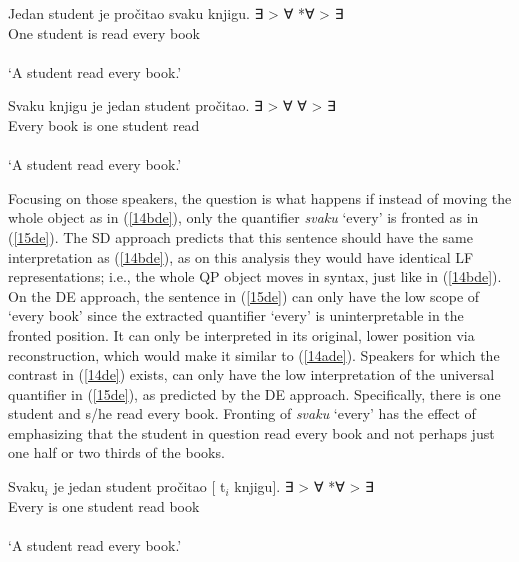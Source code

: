 \documentclass[
    output=paper,
    colorlinks,
    citecolor=brown,
]{langscibook}
\begin{document}
\begin{exe}
\ex \label{14de}
\begin{xlist}
\ex \label{14ade}
\gll Jedan student je pročitao svaku knjigu. \hspace{18mm} \cmark ∃ > ∀ *∀ > ∃\\
One student is read every book\\\\
‘A student read every book.’ 


\ex \label{14bde}
\gll Svaku knjigu je jedan student pročitao. \hspace{18mm} \cmark ∃ > ∀ \cmark ∀ > ∃ \\
Every book is one student read\\\\
‘A student read every book.’ 

\end{xlist}
\end{exe}

Focusing on those speakers, the question is what happens if instead of moving the whole object as in (\ref{14bde}), only the quantifier \textit{svaku} ‘every’ is fronted as in (\ref{15de}). The SD approach predicts that this sentence should have the same interpretation as (\ref{14bde}), as on this analysis they would have identical LF representations; i.e., the whole QP object moves in syntax, just like in (\ref{14bde}). On the DE approach, the sentence in (\ref{15de}) can only have the low scope of ‘every book’ since the extracted quantifier ‘every’ is uninterpretable in the fronted position. It can only be interpreted in its original, lower position via reconstruction, which would make it similar to (\ref{14ade}). Speakers for which the contrast in (\ref{14de}) exists, can only have the low interpretation of the universal quantifier in (\ref{15de}), as predicted by the DE approach. Specifically, there is one student and s/he read every book. Fronting of \textit{svaku} ‘every’ has the effect of emphasizing that the student in question read every book and not perhaps just one half or two thirds of the books. 

\begin{exe}
\ex \label{15de}
\gll Svaku$_{i}$ je jedan student pročitao [ t$_{i}$ knjigu]. \hspace{14mm} \cmark ∃ > ∀ *∀ > ∃\\
Every is one student read {} book\\\\
‘A student read every book.’ 
\end{exe}
\end{document}

